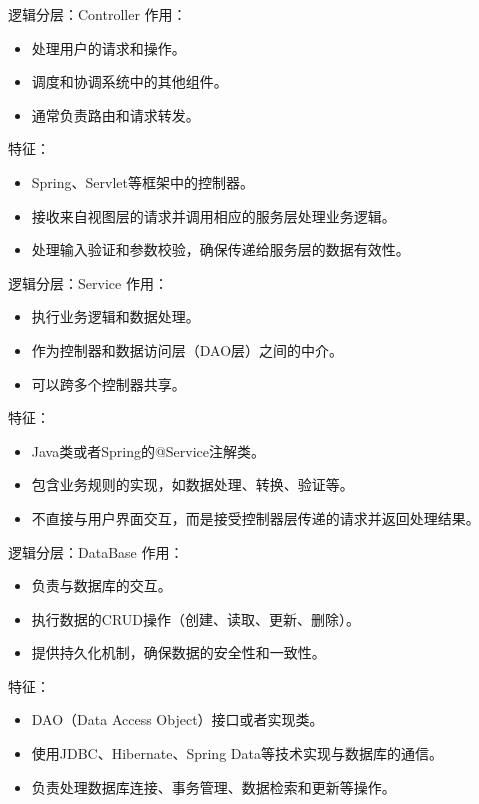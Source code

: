 \documentclass{beamer}
\begin{document}
\begin{frame}{逻辑分层：Controller}
作用：
    \begin{itemize}
    \item 处理用户的请求和操作。
    \item 调度和协调系统中的其他组件。
    \item 通常负责路由和请求转发。
    \end{itemize}
特征：
    \begin{itemize}
    \item Spring、Servlet等框架中的控制器。
    \item 接收来自视图层的请求并调用相应的服务层处理业务逻辑。
    \item 处理输入验证和参数校验，确保传递给服务层的数据有效性。
    \end{itemize}
\end{frame}
\begin{frame}{逻辑分层：Service}
作用：
    \begin{itemize}
    \item 执行业务逻辑和数据处理。
    \item 作为控制器和数据访问层（DAO层）之间的中介。
    \item 可以跨多个控制器共享。
    \end{itemize}
特征：
    \begin{itemize}
    \item Java类或者Spring的@Service注解类。
    \item 包含业务规则的实现，如数据处理、转换、验证等。
    \item 不直接与用户界面交互，而是接受控制器层传递的请求并返回处理结果。
    \end{itemize}
\end{frame}
\begin{frame}{逻辑分层：DataBase}
作用：
    \begin{itemize}
    \item 负责与数据库的交互。
    \item 执行数据的CRUD操作（创建、读取、更新、删除）。
    \item 提供持久化机制，确保数据的安全性和一致性。
    \end{itemize}
特征：
    \begin{itemize}
    \item DAO（Data Access Object）接口或者实现类。
    \item 使用JDBC、Hibernate、Spring Data等技术实现与数据库的通信。
    \item 负责处理数据库连接、事务管理、数据检索和更新等操作。
    \end{itemize}
\end{frame}
\end{document}
